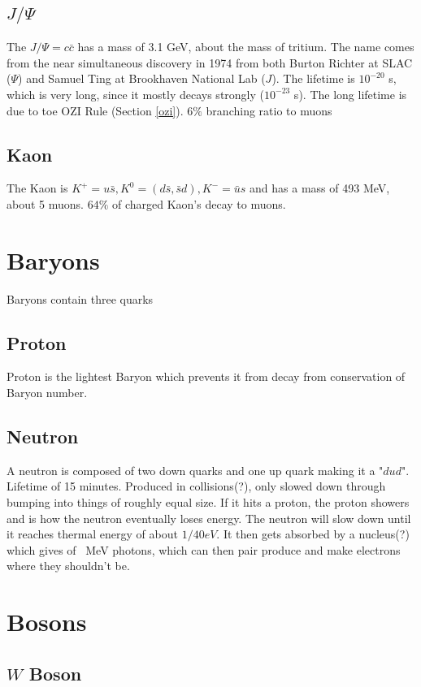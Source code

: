 \subsection{$J/\Psi$}

The $J/\Psi = c\bar{c}$ has a mass of 3.1 GeV, about the mass of tritium. The name comes from the near simultaneous discovery in 1974 from both Burton Richter at SLAC ($\Psi$) and Samuel Ting at Brookhaven National Lab ($J$). The lifetime is $10^{-20}$ s, which is very long, since it mostly decays strongly ($10^{-23}$ s). The long lifetime is due to toe OZI Rule (Section \ref{ozi}). $6\%$ branching ratio to muons

\subsection{Kaon}
The Kaon is $K^+ = u\bar{s}, K^0 =( d\bar{s}, \bar{s}d), K^- = \bar{u}s$ and has a mass of 493 MeV, about 5 muons. $64\%$ of charged Kaon's decay to muons.

\section{Baryons}
Baryons contain three quarks

\subsection{Proton}
Proton is the lightest Baryon which prevents it from decay from conservation of Baryon number.

\subsection{Neutron}

A neutron is composed of two down quarks and one up quark making it a "$dud$". 
Lifetime of 15 minutes. Produced in collisions(?), only slowed down through bumping into things of roughly equal size. If it hits a proton, the proton showers and is how the neutron eventually loses energy. The neutron will slow down until it reaches thermal energy of about $1/40 eV$. It then gets absorbed by a nucleus(?) which gives of ~MeV photons, which can then pair produce and make electrons where they shouldn't be. 


\section{Bosons}
\subsection{$W$ Boson}

